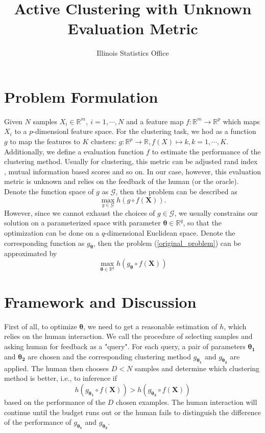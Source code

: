 \documentclass[12pt]{article}
\title{Active Clustering with Unknown Evaluation Metric}
\author{Illinois Statistics Office}
\date{}
\renewcommand{\vec}{\bm}
\begin{document}
\large
\maketitle

\section{Problem Formulation}
Given $N$ samples $X_i\in \mathbb{R}^m,~i=1,\cdots,N$ and a feature map $f: \mathbb{R}^m\rightarrow \mathbb{R}^p$ which maps $X_i$ to a $p$-dimensionl feature space. For the clustering task, we hod as a function $g$ to map the features to $K$ clusters: $g:\mathbb{R}^p\rightarrow \mathbb{R}, f(X)\longmapsto k,k=1,\cdots, K$. Additionally, we define a evaluation function $f$ to estimate the performance of the clustering method. Usually for clustering, this metric can be adjusted rand index \cite{hubert_comparing_1985}, mutual information based scores \cite{Vinh:2009:mutual} and so on. In our case, however, this evaluation metric is unknown and relies on the feedback of the human (or the oracle). Denote the function space of $g$ as $\mathcal{G}$, then the problem can be described as
\begin{equation}\label{original_problem}
\max_{g\in\mathcal{G}} h(g\circ f(\mathbf{X})).
\end{equation}
However, since we cannot exhaust the choices of $g\in \mathcal{G}$, we usually constrains our solution on a parameterized space with parameter ${\vec{\theta}}\in \mathbb{R}^q$, so that the optimization can be done on a $q$-dimensional Euclidean space. Denote the corresponding function as $g_{\vec{\theta}}$, then the problem (\ref{original_problem}) can be approximated by
\begin{equation}\label{para_problem}
\max_{\vec{\theta}\in\mathbb{R}^q } h(g_{\vec{\theta}}\circ f(\mathbf{X}))
\end{equation}

\section{Framework and Discussion}
First of all, to optimize $\vec{\theta}$, we need to get a reasonable estimation of $h$, which relies on the human interaction. We call the procedure of selecting samples and asking human for feedback as a "query". For each query, a pair of parameters $\vec{\theta_1}$ and $\vec{\theta_2}$ are chosen and the corresponding clustering method $g_{\vec{\theta_1}}$ and $g_{\vec{\theta_2}}$ are applied. The human then chooses $D<N$ samples and determine which clustering method is better, i.e., to inference if
\begin{equation}
h(g_{\vec{\theta_1}}\circ f(\vec{X}))>h(g_{\vec{\theta_2}}\circ f(\vec{X}))
\end{equation}
based on the performance of the $D$ chosen examples. The human interaction will continue until the budget runs out or the human fails to distinguish the difference of the performance of $g_{\vec{\theta_1}}$ and $g_{\vec{\theta_2}}$.
\end{document}
